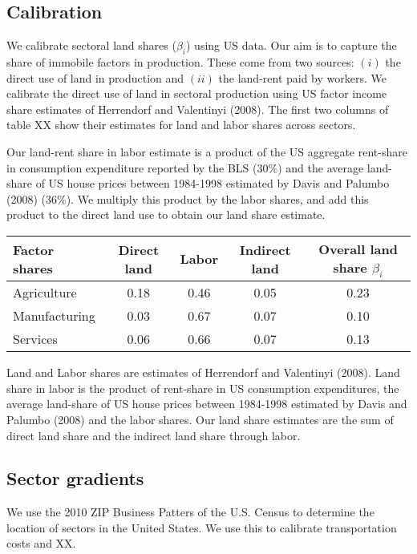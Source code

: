 \documentclass[12pt]{article}
\begin{document}
\subsection{Calibration}

We calibrate sectoral land shares ($\beta_i$) using US data. Our aim is to capture the share of immobile factors in production. These come from two sources: $(i)$ the direct use of land in production and $(ii)$ the land-rent paid by workers. We calibrate the direct use of land in sectoral production using US factor income share estimates of Herrendorf and Valentinyi (2008). The first two columns of table XX show their estimates for land and labor shares across sectors.

Our land-rent share in labor estimate is a product of the US aggregate rent-share in consumption expenditure reported by the BLS ($30\%$) and the average land-share of US house prices between 1984-1998 estimated by Davis and Palumbo (2008) (36\%). We multiply this product by the labor shares, and add this product to the direct land use to obtain our land share estimate.

\begin{table}[h!] \center
\begin{tabular}{l|ccc|c}
\hline 
Factor shares & Direct land & Labor & Indirect land & Overall land share $\beta_i$ \\ \hline
Agriculture & 0.18 & 0.46  & 0.05 & 0.23 \\
Manufacturing& 0.03 & 0.67 & 0.07 & 0.10  \\
Services    &  0.06 & 0.66 & 0.07 & 0.13 \\ \hline 
\end{tabular}

\noindent \footnotesize{Land and Labor shares are estimates of Herrendorf and Valentinyi (2008). Land share in labor is the product of rent-share in US consumption expenditures, the average land-share of US house prices between 1984-1998 estimated by Davis and Palumbo (2008) and the labor shares. Our land share estimates are the sum of direct land share and the indirect land share through labor.}
\end{table}





\subsection{Sector gradients}
We use the 2010 ZIP Business Patters of the U.S. Census to determine the location of sectors in the United States. We use this to calibrate transportation costs and XX.
\end{document}
